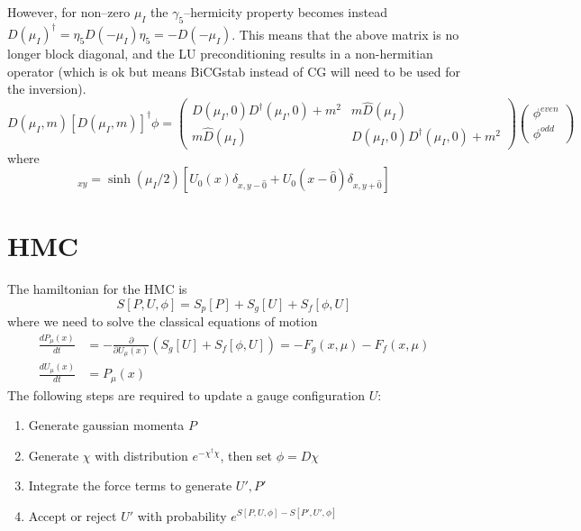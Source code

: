 \documentclass[a4paper,12pt]{article}
\begin{document}
However, for non--zero $\mu_I$ the $\gamma_5$--hermicity property becomes instead $D(\mu_I)^{\dagger} = \eta_5 D(-\mu_I) \eta_5 = -D(-\mu_I)$. This means that the above matrix is 
no longer block diagonal, and the LU preconditioning results in a non-hermitian operator (which is ok but means BiCGstab instead of CG will need to be used for the inversion).
\begin{equation}
D(\mu_I,m) [D(\mu_I,m)]^{\dagger} \phi = 
\begin{pmatrix}
D(\mu_I,0)D^{\dagger}(\mu_I,0) + m^2 & m\hat D(\mu_I) \\
 m\hat D(\mu_I) & D(\mu_I,0)D^{\dagger}(\mu_I,0) + m^2
\end{pmatrix}
\begin{pmatrix}
\phi^{even} \\
\phi^{odd}
\end{pmatrix}
\end{equation}
where
\begin{equation}
 [\hat D(\mu_I)]_{xy} = \sinh(\mu_I/2)\left[U_0(x)\delta_{x,y-\hat0} + U_0(x-\hat0)\delta_{x,y+\hat0}\right]
\end{equation}

\section{HMC}
The hamiltonian for the HMC is
\begin{equation}
 S[P, U, \phi] = S_p[P] + S_g[U] + S_f[\phi, U]
\end{equation}
where we need to solve the classical equations of motion
\begin{align}
 \frac{dP_{\mu}(x)}{dt} &= -\frac{\partial}{\partial U_{\mu}(x)}\left(S_g[U] + S_f[\phi, U]\right) = -F_g(x,\mu) - F_f(x,\mu) \\
 \frac{dU_{\mu}(x)}{dt} &= P_{\mu}(x)
\end{align}
The following steps are required to update a gauge configuration $U$:
\begin{enumerate}
 \item Generate gaussian momenta $P$
 \item Generate $\chi$ with distribution $e^{-\chi^{\dagger}\chi}$, then set $\phi = D\chi$
 \item Integrate the force terms to generate $U', P'$
 \item Accept or reject $U'$ with probability $e^{S[P, U, \phi] - S[P', U', \phi]}$
\end{enumerate}
\end{document}

